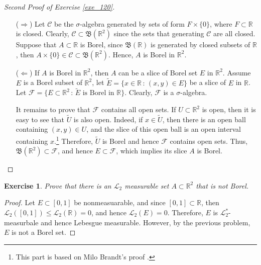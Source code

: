 \documentclass[11pt]{book}
\newtheorem{exercise}{Exercise}[section]
\theoremstyle{definition}
\numberwithin{equation}{chapter}
\begin{document}
\begin{proof}[Second Proof of Exercise \ref{exe_120}]
~\begin{enumerate}
    \item[($\Rightarrow$)] Let $\mathcal{C}$ be the $\sigma$-algebra generated by sets of form $F \times \{0\}$, where $F \subset \mathbb{R}$ is closed. Clearly, $\mathcal{C} \subset \mathfrak{B}(\mathbb{R}^2)$ since the sets that generating $\mathcal{C}$ are all closed. Suppose that $A \subset \mathbb{R}$ is Borel, since $\mathfrak{B}(\mathbb{R})$ is generated by closed subsets of $\mathbb{R}$, then $A \times \{0\} \in \mathcal{C} \subset \mathfrak{B}(\mathbb{R}^2)$. Hence, $A$ is Borel in $\mathbb{R}^2$.
    
    \item[($\Leftarrow$)] If $A$ is Borel in $\mathbb{R}^2$, then $A$ can be a slice of Borel set $E$ in $\mathbb{R}^2$. Assume $E$ is a Borel subset of $\mathbb{R}^2$, let $\widetilde{E} = \{x \in \mathbb{R}\,:\, (x,y) \in E\}$ be a slice of $E$ in $\mathbb{R}$. Let $\mathcal{F} = \{E \subset \mathbb{R}^2\,:\, \widetilde{E}\,\,\text{is Borel in $\mathbb{R}$}\}$. Clearly, $\mathcal{F}$ is a $\sigma$-algebra.
    
    It remains to prove that $\mathcal{F}$ contains all open sets. If $U \subset \mathbb{R}^2$ is open, then it is easy to see that $\widetilde{U}$ is also open. Indeed, if $x \in \widetilde{U}$, then there is an open ball containing $(x,y) \in U$, and the slice of this open ball is an open interval containing $x$.\footnote{This part is based on Milo Brandt's proof \cite{24}.} Therefore, $\widetilde{U}$ is Borel and hence $\mathcal{F}$ contains open sets. Thus, $\mathfrak{B}(\mathbb{R}^2) \subset \mathcal{F}$, and hence $E \subset \mathcal{F}$, which implies its slice $A$ is Borel.
\end{enumerate}
\end{proof}

\medskip

\begin{exercise}
Prove that there is an $\mathcal{L}_2$ measurable set $A\subset\mathbb{R}^2$ that is not Borel.
\end{exercise}
\begin{proof}
Let $E \subset [0,1]$ be nonmeasuarable, and since $[0,1] \subset \mathbb{R}$, then $\mathcal{L}_2([0,1]) \leq \mathcal{L}_2(\mathbb{R}) = 0$, and hence $\mathcal{L}_2(E) = 0$. Therefore, $E$ is $\mathcal{L}^*_2$-measurbale and hence Lebesgue measurable. However, by the previous problem, $E$ is not a Borel set.
\end{proof}
\end{document}
